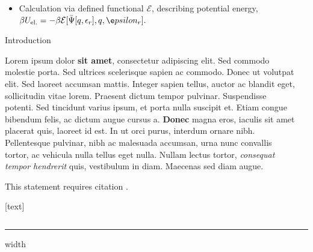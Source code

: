 \documentclass{beamer}
\newlength{\sepwid}
\newlength{\onecolwid}
\begin{document}
\begin{frame}[t]{}
\begin{columns}[t]
\begin{column}{\onecolwid}
{\begin{itemize}
                                                         \begin{itemize}
                                                                 \normalsize
                                                                 \item Calculation via defined functional $\mathcal{E}$, describing potential energy, $\beta U_{\mathrm{el.}} = - \beta \mathcal{E}[\bar{\Psi}[q,\epsilon_r],q,\e    psilon_r].$
                                                         \end{itemize}
                                         \end{itemize}
                                 }
				\begin{block}{Introduction}

			Lorem ipsum dolor \textbf{sit amet}, consectetur adipiscing elit. Sed commodo molestie porta. Sed ultrices scelerisque sapien ac commodo. Donec ut volutpat elit. Sed laoreet accumsan mattis. Integer sapien tellus, auctor ac blandit eget, sollicitudin vitae lorem. Praesent dictum tempor pulvinar. Suspendisse potenti. Sed tincidunt varius ipsum, et porta nulla suscipit et. Etiam congue bibendum felis, ac dictum augue cursus a. \textbf{Donec} magna eros, iaculis sit amet placerat quis, laoreet id est. In ut orci purus, interdum ornare nibh. Pellentesque pulvinar, nibh ac malesuada accumsan, urna nunc convallis tortor, ac vehicula nulla tellus eget nulla. Nullam lectus tortor, \textit{consequat tempor hendrerit} quis, vestibulum in diam. Maecenas sed diam augue.

			This statement requires citation \cite{Smith:2012qr}.

			\begin{minipage}{1\textwidth}
                                         [text]
                                         
                                         
                         \end{minipage}
				\end{block}
			\end{column}
			\begin{column}{\sepwid}\end{column}

		\end{columns}
		\vspace{1cm}
		\vfill
		\color{mpg-green}
		\hrule height 4pt width \textwidth
		\color{black}
	\end{frame}
\end{document}

